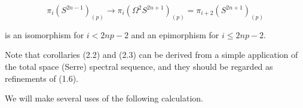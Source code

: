 $$\pi_i(S^{2n-1})_{(p)} \rightarrow \pi_i(\Omega^2 S^{2n+1})_{(p)} = \pi_{i+2}(S^{2n+1})_{(p)}$$

is an isomorphism for $i < 2np - 2$ and an epimorphism for $i \leq 2np - 2$.

Note that corollaries (2.2) and (2.3) can be derived from a simple application of the total space (Serre) spectral sequence, and they should be regarded as refinements of (1.6).

We will make several uses of the following calculation.
